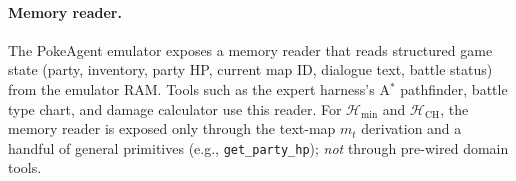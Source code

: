 \paragraph{Memory reader.} The PokeAgent emulator exposes a memory reader that reads structured game state (party, inventory, party HP, current map ID, dialogue text, battle status) from the emulator RAM. Tools such as the expert harness's A$^*$ pathfinder, battle type chart, and damage calculator use this reader. For $\mathcal{H}_{\min}$ and $\mathcal{H}_\mathrm{CH}$, the memory reader is exposed only through the text-map $m_t$ derivation and a handful of general primitives (e.g., \texttt{get\_party\_hp}); \emph{not} through pre-wired domain tools.
